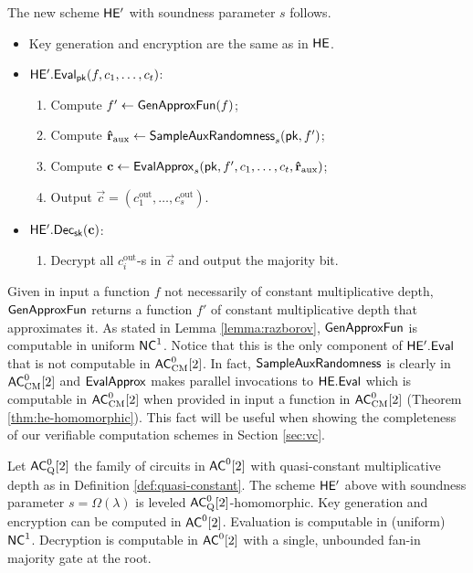 \bigskip

The new scheme $\mathsf{HE'}$ with soundness parameter $s$ follows.
\begin{framed}
\begin{itemize}
\item Key generation and encryption are the same as in  $\mathsf{HE}$.
\item $\mathsf{HE'.Eval}_{\mathsf{pk}}(f, c_1,\dots,c_t)$:
\begin{enumerate}
\item Compute $f' \gets \mathsf{GenApproxFun}(f)$;
\item Compute $\mathbf{\hat{r}}_{\text{aux}} \gets \mathsf{SampleAuxRandomness}_s(\mathsf{pk}, f')$;
\item Compute $\mathbf{c} \gets \mathsf{EvalApprox}_s(\mathsf{pk}, f', c_1,\dots, c_t, \mathbf{\hat{r}}_{\text{aux}})$;
\item Output $\vec{c} = (c^{\text{out}}_1, \dots, c^{\text{out}}_{s})$.
\end{enumerate}
\item $\mathsf{HE'.Dec}_{\mathsf{sk}}(\mathbf{c})$:
\begin{enumerate}
\item Decrypt all $c^{\text{out}}_i$-s in $\vec{c}$ and output the majority bit.
\end{enumerate}
\end{itemize}
\end{framed}

\begin{remark}
Given in input a function $f$ not necessarily of constant multiplicative depth,  $\mathsf{GenApproxFun}$ returns a function $f'$ of constant multiplicative depth that approximates it.
As stated in Lemma \ref{lemma:razborov}, $\mathsf{GenApproxFun}$ is computable in uniform ${\mathsf{NC}}^1$. Notice that this is the only component of $\mathsf{HE'.Eval}$ that is not computable in ${\mathsf{AC}}^0_{\text{CM}}[2]$. In fact, $\mathsf{SampleAuxRandomness}$ is clearly in ${\mathsf{AC}}^0_{\text{CM}}[2]$ and $\mathsf{EvalApprox}$ makes parallel invocations to $\mathsf{HE.Eval}$ which is computable in ${\mathsf{AC}}^0_{\text{CM}}[2]$ when provided in input a function in ${\mathsf{AC}}^0_{\text{CM}}[2]$ (Theorem \ref{thm:he-homomorphic}). This fact will be useful when showing the completeness of our verifiable computation schemes in Section \ref{sec:vc}.
\end{remark}

\begin{theorem}
\label{thm:hep-homomorphic}
Let ${\mathsf{AC}}^0_{\text{Q}}[2]$ the family of circuits in ${\mathsf{AC}}^0[2]$ with quasi-constant multiplicative depth as in Definition \ref{def:quasi-constant}.
The scheme $\mathsf{HE'}$ above with soundness parameter $s = \Omega(\lambda)$ is leveled ${\mathsf{AC}}^0_{\text{Q}}[2]$-homomorphic. Key generation and encryption can be computed in ${\mathsf{AC}}^0[2]$. Evaluation is computable in (uniform) ${\mathsf{NC}}^1$. Decryption is computable in ${\mathsf{AC}}^0[2]$ with a single, unbounded fan-in majority gate at the root.
\end{theorem}